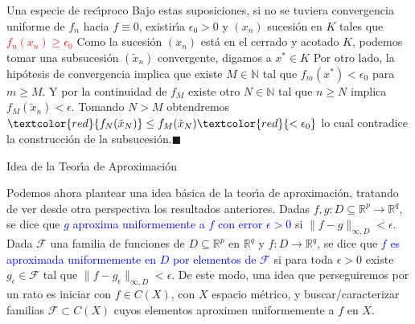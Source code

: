 \documentclass[xcolor=dvipsnames,10pt,handout, draft]{beamer}
\newcommand{\nz}{\mathbb N}
\newcommand{\rzp}{\mathbb R^{p}}
\newcommand{\rzq}{\mathbb R^{q}}
\begin{document}
\begin{frame}{Una especie de rec\'\i proco}
Bajo estas suposiciones, si no se tuviera convergencia uniforme de $f_n$ hacia $f\equiv0$, existir\'\i a $\epsilon_0>0$ y $(x_n)$ sucesi\'on en $K$ tales que \textcolor{red}{$f_n(x_n)\geq\epsilon_0$}
\pause\vskip6pt
Como la sucesi\'on $(x_n)$ est\'a en el cerrado y acotado $K$, podemos tomar una subsucesi\'on $(\tilde x_n)$ convergente, digamos a $x^*\in K$
\pause\vskip6pt
Por otro lado, la hip\'otesis de convergencia implica que existe $M\in\nz$ tal que $f_m(x^*)<\epsilon_0$ para $m\geq M$.
\pause\vskip6pt
Y por la continuidad de $f_M$ existe otro $N\in\nz$ tal que $n\geq N$ implica $f_M(\tilde x_n)<\epsilon$.
\pause\vskip6pt
Tomando $N>M$ obtendremos $\textcolor{red}{f_N(\tilde x_N)}\leq f_M(\tilde x_N)\textcolor{red}{<\epsilon_0}$ \pause lo cual contradice la construcci\'on de la subsucesi\'on.\hfill$\blacksquare$ 
\end{frame}










\begin{frame}{Idea de la Teor\'\i a de Aproximaci\'on}

Podemos ahora plantear una idea b\'asica de la teor\'\i a de aproximaci\'on, tratando de ver desde otra perspectiva los resultados anteriores.
\vskip6pt\pause
Dadas $f,g:D\subseteq\rzp\to\rzq$, se dice que \textcolor{blue}{$g$ aproxima uniformemente a $f$ con error $\epsilon>0$} si $\|f-g\|_{\infty,D}<\epsilon$.
\vskip6pt\pause
Dada $\mathcal F$ una familia de funciones de $D\subseteq\rzp$ en $\rzq$ y $f:D\to\rzq$, se dice que \textcolor{blue}{$f$ es aproximada uniformemente en $D$ por elementos de $\mathcal F$} si para toda $\epsilon>0$ existe $g_\epsilon\in\mathcal F$ tal que $\|f-g_\epsilon\|_{\infty,D}<\epsilon$.
\vskip8pt\pause
 De este modo, una idea que perseguiremos por un rato es iniciar con $f\in C(X)$, con $X$ espacio m\'etrico, y buscar/caracterizar familias $\mathcal F\subset C(X)$ cuyos elementos aproximen uniformemente a $f$ en $X$.
\end{frame}
\end{document}
